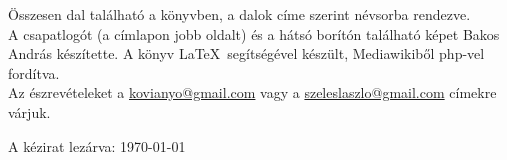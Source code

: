 %


\vfill
Összesen dal található a könyvben, a dalok címe szerint névsorba rendezve. 
~\\[\baselineskip]
A csapatlogót (a címlapon jobb oldalt) és a hátsó borítón található képet Bakos András készítette.
A könyv \LaTeX~segítségével készült, Mediawikiből php-vel fordítva.
~\\[\baselineskip]
Az észrevételeket a \mbox{\href{mailto:kovianyo@gmail.com}{kovianyo@gmail.com}} vagy a \mbox{\href{mailto:szeleslaszlo@gmail.com}{szeleslaszlo@gmail.com}} címekre várjuk.

A kézirat lezárva: \today